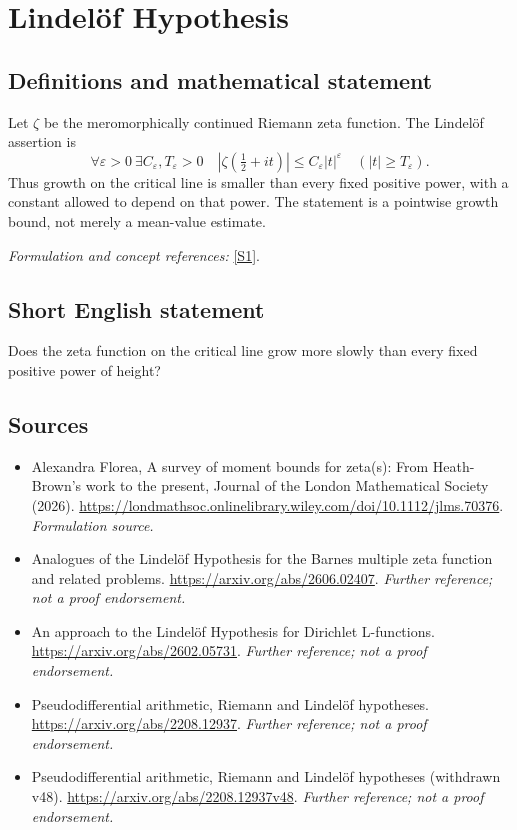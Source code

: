 \documentclass[11pt]{article}
\begin{document}
\section*{\texorpdfstring{Lindelöf Hypothesis}{Lindelöf Hypothesis}}\label{1274}
\subsection{Definitions and mathematical statement}
Let $\zeta$ be the meromorphically continued Riemann zeta function. The Lindelöf assertion is
\[
 \forall\varepsilon>0\ \exists C_\varepsilon,T_\varepsilon>0\quad
 |\zeta(\tfrac12+it)|\le C_\varepsilon|t|^\varepsilon
 \quad(|t|\ge T_\varepsilon).
\]
Thus growth on the critical line is smaller than every fixed positive power, with a constant allowed to depend on that power. The statement is a pointwise growth bound, not merely a mean-value estimate.
\par\smallskip\textit{Formulation and concept references:} \href{https://londmathsoc.onlinelibrary.wiley.com/doi/10.1112/jlms.70376}{[S1]}.

\subsection{Short English statement}
Does the zeta function on the critical line grow more slowly than every fixed positive power of height?
\subsection{Sources}
\begin{itemize}
\item[S1]Alexandra Florea, A survey of moment bounds for zeta(s): From Heath-Brown's work to the present, Journal of the London Mathematical Society (2026).
\url{https://londmathsoc.onlinelibrary.wiley.com/doi/10.1112/jlms.70376}.
\textit{Formulation source.}
\item[S2]Analogues of the Lindelöf Hypothesis for the Barnes multiple zeta function and related problems.
\url{https://arxiv.org/abs/2606.02407}.
\textit{Further reference; not a proof endorsement.}
\item[S3]An approach to the Lindelöf Hypothesis for Dirichlet L-functions.
\url{https://arxiv.org/abs/2602.05731}.
\textit{Further reference; not a proof endorsement.}
\item[S4]Pseudodifferential arithmetic, Riemann and Lindelöf hypotheses.
\url{https://arxiv.org/abs/2208.12937}.
\textit{Further reference; not a proof endorsement.}
\item[S5]Pseudodifferential arithmetic, Riemann and Lindelöf hypotheses (withdrawn v48).
\url{https://arxiv.org/abs/2208.12937v48}.
\textit{Further reference; not a proof endorsement.}
\end{itemize}
\end{document}
